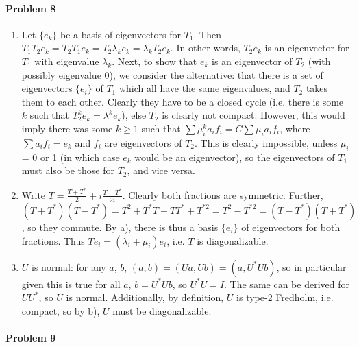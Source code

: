 \documentclass[12pt]{article}
\begin{document}
\paragraph{Problem 8}
\begin{enumerate}[label=\alph*)]
\item Let $\{e_k\}$ be a basis of eigenvectors for $T_1$. Then $T_1T_2e_k =
  T_2T_1e_k = T_2\lambda_ke_k = \lambda_kT_2e_k$. In other words, $T_2e_k$ is
  an eigenvector for $T_1$ with eigenvalue $\lambda_k$. Next, to show that
  $e_k$ is an eigenvector of $T_2$ (with possibly eigenvalue 0), we consider
  the alternative: that there is a set of eigenvectors $\{e_i\}$ of $T_1$ which
  all have the same eigenvalues, and $T_2$ takes them to each other. Clearly
  they have to be a closed cycle (i.e. there is some $k$ such that $T_2^ke_k =
  \lambda^ke_k$), else $T_2$ is clearly not compact. However, this would imply
  there was some $k\geq 1$ such that $\sum\mu_i^ka_if_i = C\sum\mu_ia_if_i$,
  where $\sum a_if_i = e_k$ and $f_i$ are eigenvectors of $T_2$. This is
  clearly impossible, unless $\mu_i$ = 0 or 1 (in which case $e_k$ would be an
  eigenvector), so the eigenvectors of $T_1$ must also be those for
  $T_2$, and vice versa.
\item Write $T = \frac{T+T^*}{2} + i\frac{T-T^*}{2i}$. Clearly both fractions
  are symmetric. Further, $(T+T^*)(T-T^*)= T^2 + T^*T+TT^*+T^{*2} = T^2-T^{*2}
  = (T-T^*)(T+T^*)$, so they commute. By a), there is thus a basis $\{e_i\}$ of
  eigenvectors for both fractions. Thus $Te_i = (\lambda_i + \mu_i)e_i$, i.e.
  $T$ is diagonalizable.
\item $U$ is normal: for any $a$, $b$, $(a,b) = (Ua,Ub) = (a,U^*Ub)$, so
  in particular given this is true for all $a$, $b = U^*Ub$, so $U^*U = I$.
  The same can be derived for $UU^*$, so $U$ is normal. Additionally, by
  definition, $U$ is type-2 Fredholm, i.e. compact, so by b), $U$ must be
  diagonalizable.
\end{enumerate}

\paragraph{Problem 9}
\end{document}
